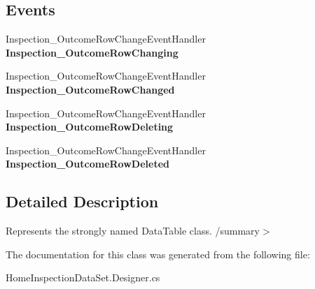 \subsection*{Events}
\begin{DoxyCompactItemize}
\item 
\mbox{\label{class_a_f_h___scheduler_1_1_home_inspection_data_set_1_1_inspection___outcome_data_table_aa7b67677949ad42bfb14edfdbfa9de65}} 
Inspection\+\_\+\+Outcome\+Row\+Change\+Event\+Handler {\bfseries Inspection\+\_\+\+Outcome\+Row\+Changing}
\item 
\mbox{\label{class_a_f_h___scheduler_1_1_home_inspection_data_set_1_1_inspection___outcome_data_table_a91e54981f3d474c905ef4106a558f0d6}} 
Inspection\+\_\+\+Outcome\+Row\+Change\+Event\+Handler {\bfseries Inspection\+\_\+\+Outcome\+Row\+Changed}
\item 
\mbox{\label{class_a_f_h___scheduler_1_1_home_inspection_data_set_1_1_inspection___outcome_data_table_a1774027270a6935f7edb228174488242}} 
Inspection\+\_\+\+Outcome\+Row\+Change\+Event\+Handler {\bfseries Inspection\+\_\+\+Outcome\+Row\+Deleting}
\item 
\mbox{\label{class_a_f_h___scheduler_1_1_home_inspection_data_set_1_1_inspection___outcome_data_table_a28b3cd9358c67447f487a732408db91a}} 
Inspection\+\_\+\+Outcome\+Row\+Change\+Event\+Handler {\bfseries Inspection\+\_\+\+Outcome\+Row\+Deleted}
\end{DoxyCompactItemize}


\subsection{Detailed Description}
Represents the strongly named Data\+Table class. /summary$>$ 

The documentation for this class was generated from the following file\+:\begin{DoxyCompactItemize}
\item 
Home\+Inspection\+Data\+Set.\+Designer.\+cs\end{DoxyCompactItemize}

